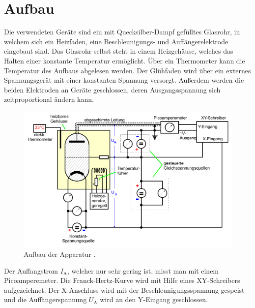 \section{Aufbau}
\label{sec:Aufbau}

Die verwendeten Geräte sind ein mit Quecksilber-Dampf gefülltes Glasrohr, in welchem sich ein Heizfaden, eine Beschleunigungs- und Auffängerelektrode eingebaut sind.
Das Glasrohr selbst steht in einem Heizgehäuse, welches das Halten einer konstante Temperatur ermöglicht. Über ein Thermometer kann die Temperatur des Aufbaus abgelesen werden.
Der Glühfaden wird über ein externes Spannungsgerät mit einer konstanten Spannung versorgt. Außerdem werden die beiden Elektroden an Geräte geschlossen, deren 
Ausgangsspannung sich zeitproportional ändern kann.
\begin{figure}
    \centering
    \includegraphics[width = 10 cm]{Aufbau.pdf}
    \caption{Aufbau der Apparatur \cite{ap601}.}
    \label{fig:AufbauMessung}
\end{figure}

Der Auffangstrom $I_{\text{A}}$, welcher nur sehr gering ist, misst man mit einem Picoamperemeter.
Die Franck-Hertz-Kurve wird mit Hilfe eines XY-Schreibers aufgezeichnet. Der X-Anschluss wird mit der Beschleunigungsspannung 
gespeist und die Auffängerspannung $U_{\text{A}}$ wird an den Y-Eingang geschlossen.